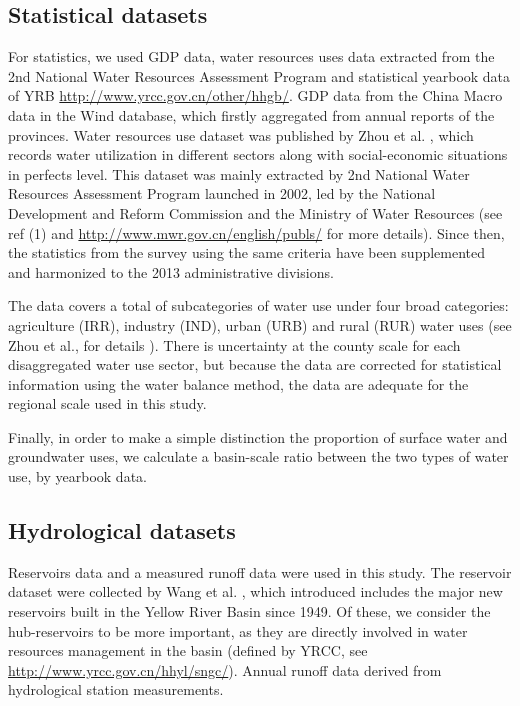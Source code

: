 \documentclass[9pt,twoside,lineno]{pnas-new}
\begin{document}
\subsection*{Statistical datasets}
For statistics, we used GDP data, water resources uses data extracted from the 2nd National Water Resources Assessment Program \cite{zhouDecelerationChinaHuman2020} and statistical yearbook data of YRB \url{http://www.yrcc.gov.cn/other/hhgb/}. 
GDP data from the China Macro data in the Wind database, which firstly aggregated from annual reports of the provinces. Water resources use dataset was published by Zhou et al. \cite{zhouDecelerationChinaHuman2020}, which records water utilization in different sectors along with social-economic situations in perfects level. This dataset was mainly extracted by 2nd National Water Resources Assessment Program launched in 2002, led by the National Development and Reform Commission and the Ministry of Water Resources (see ref (1) and \url{http://www.mwr.gov.cn/english/publs/} for more details). Since then, the statistics from the survey using the same criteria have been supplemented and harmonized to the 2013 administrative divisions. 

The data covers a total of subcategories of water use under four broad categories: agriculture (IRR), industry (IND), urban (URB) and rural (RUR) water uses (see Zhou et al., for details \cite{zhouDecelerationChinahuman2020}). There is uncertainty at the county scale for each disaggregated water use sector, but because the data are corrected for statistical information using the water balance method, the data are adequate for the regional scale used in this study.

Finally, in order to make a simple distinction the proportion of surface water and groundwater uses, we calculate a basin-scale ratio between the two types of water use, by yearbook data. 


\subsection*{Hydrological datasets}
Reservoirs data and a measured runoff data were used in this study.
The reservoir dataset were collected by Wang et al. \cite{wangYellowRiverWater2019}, which introduced includes the major new reservoirs built in the Yellow River Basin since 1949. 
Of these, we consider the hub-reservoirs to be more important, as they are directly involved in water resources management in the basin (defined by YRCC, see \url{http://www.yrcc.gov.cn/hhyl/sngc/}). 
Annual runoff data derived from hydrological station measurements.
\end{document}
